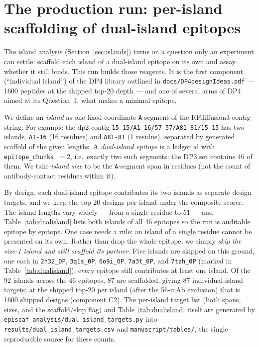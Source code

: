 \section{The production run: per-island scaffolding of dual-island epitopes}\label{sec:perisland}
The island analysis (Section~\ref{sec:islands}) turns on a question only an experiment can
settle: scaffold each island of a dual-island epitope on its own and assay whether it still
binds. This run builds those reagents. It is the first component (``individual island'') of the
DP4 library outlined in \texttt{docs/DP4designIdeas.pdf} --- \num{1600} peptides at the shipped
top-\num{20} depth --- and one of several arms of DP4 aimed at its
Question~1, what makes a minimal epitope.

We define an \emph{island} as one fixed-coordinate \texttt{A}-segment of the RFdiffusion3
contig string. For example the dp2 contig \texttt{15-15/A1-16/57-57/A81-81/15-15} has two
islands, \texttt{A1-16} (16 residues) and \texttt{A81-81} (1 residue), separated by generated
scaffold of the given lengths. A \emph{dual-island epitope} is a ledger id with
\texttt{epitope\_chunks}~$=2$, i.e.\ exactly two such segments; the DP3 set contains
\num{46} of them. We take \emph{island size} to be the \texttt{A}-segment span in residues
(not the count of antibody-contact residues within it).

By design, each dual-island epitope contributes its two islands as separate
design targets, and we keep the top \num{20} designs per island under the composite scorer.
The island lengths vary widely --- from a single residue to \num{51} --- and Table~\ref{tab:dualisland}
lists both islands of all \num{46} epitopes so the run is auditable epitope by epitope. One
case needs a rule: an island of a single residue cannot be presented on its own. Rather than
drop the whole epitope, we simply \emph{skip the size-\num{1} island and still scaffold its
partner}. Five islands are skipped on this ground, one each in \texttt{2h32\_0P},
\texttt{3q1s\_0P}, \texttt{6o9i\_0P}, \texttt{7a3t\_0P}, and \texttt{7tzh\_0P} (marked in
Table~\ref{tab:dualisland}); every epitope still contributes at least one island. Of the
\num{92} islands across the \num{46} epitopes, \num{87} are scaffolded, giving \num{87}
individual-island targets; at the shipped top-\num{20} per island (after the 56-mAb exclusion) that
is \num{1600} shipped designs (component C2). The per-island
target list (both spans, sizes, and the scaffold/skip flag) and Table~\ref{tab:dualisland}
itself are generated by \texttt{episcaf\_analysis/dual\_island\_targets.py} into
\texttt{results/dual\_island\_targets.csv} and \texttt{manuscript/tables/}, the single
reproducible source for these counts.

